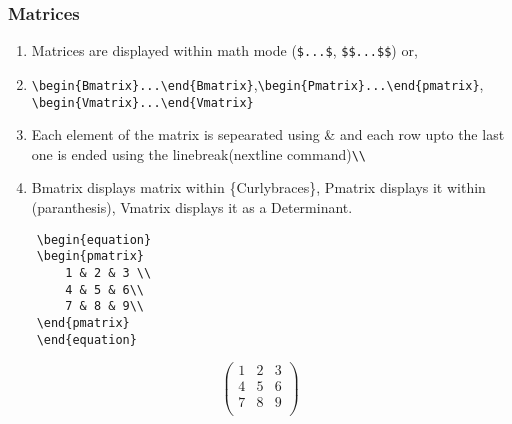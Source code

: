 \documentclass{article}
\begin{document}
\subsubsection{Matrices}
\begin{enumerate}
	\item Matrices are displayed within math mode (\verb*|$...$|, \verb*|$$...$$|) or,
	\item \verb*|\begin{Bmatrix}...\end{Bmatrix}|,\verb*|\begin{Pmatrix}...\end{pmatrix}|, \verb*|\begin{Vmatrix}...\end{Vmatrix}|
	\item Each element of the matrix is sepearated using \& and each row upto the last one is ended using the linebreak(nextline command)\verb*|\\|
	\item Bmatrix displays matrix within \{Curlybraces\}, Pmatrix displays it within (paranthesis), Vmatrix displays it as a Determinant.
\end{enumerate}
\begin{verbatim}
	\begin{equation}
	\begin{pmatrix}
		1 & 2 & 3 \\
		4 & 5 & 6\\
		7 & 8 & 9\\
	\end{pmatrix}
	\end{equation}
\end{verbatim}
\begin{equation}
	\begin{pmatrix}
		1 & 2 & 3 \\
		4 & 5 & 6\\
		7 & 8 & 9\\
	\end{pmatrix}
\end{equation}
\end{document}
